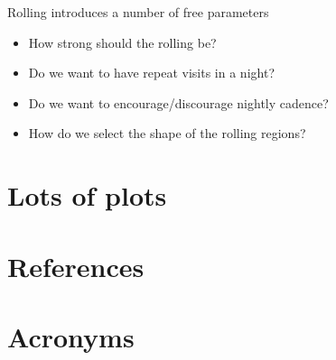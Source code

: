 \documentclass[modern]{aastex62}
\begin{document}
Rolling introduces a number of free parameters
\begin{itemize}
    \item{How strong should the rolling be?}
    \item{Do we want to have repeat visits in a night?}
    \item{Do we want to encourage/discourage nightly cadence?}
    \item{How do we select the shape of the rolling regions?}
\end{itemize}




\section{Lots of plots}


\section{References} \label{sec:bib}



\section{Acronyms} \label{sec:acronyms}

\end{document}
